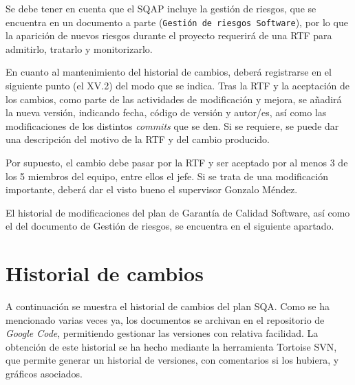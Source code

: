 \documentclass[spanish,a4paper,11pt, twoside]{report}	%
\begin{document}
	Se debe tener en cuenta que el SQAP incluye la gestión de riesgos, que se encuentra en un documento a parte (\texttt{Gestión de riesgos Software}), por lo que la aparición de nuevos riesgos durante el proyecto requerirá de una RTF para admitirlo, tratarlo y monitorizarlo.

	En cuanto al mantenimiento del historial de cambios, deberá registrarse en el siguiente punto (el XV.2) del modo que se indica. Tras la RTF y la aceptación de los cambios, como parte de las actividades de modificación y mejora, se añadirá la nueva versión, indicando fecha, código de versión y autor/es, así como las modificaciones de los distintos \textit{commits} que se den. Si se requiere, se puede dar una descripción del motivo de la RTF y del cambio producido.
		
	Por supuesto, el cambio debe pasar por la RTF y ser aceptado por al menos 3 de los 5 miembros del equipo, entre ellos el jefe. Si se trata de una modificación importante, deberá dar el visto bueno el supervisor Gonzalo Méndez.

	El historial de modificaciones del plan de Garantía de Calidad Software, así como el del documento de Gestión de riesgos, se encuentra en el siguiente apartado.

	\section{Historial de cambios}
	
	A continuación se muestra el historial de cambios del plan SQA. Como se ha mencionado varias veces ya, los documentos se archivan en el repositorio de \textit{Google Code}, permitiendo gestionar las versiones con relativa facilidad. La obtención de este historial se ha hecho mediante la herramienta Tortoise SVN, que permite generar un historial de versiones, con comentarios si los hubiera, y gráficos asociados.


\newpage
\mbox{}
\thispagestyle{empty}						%
\newpage
\end{document}
